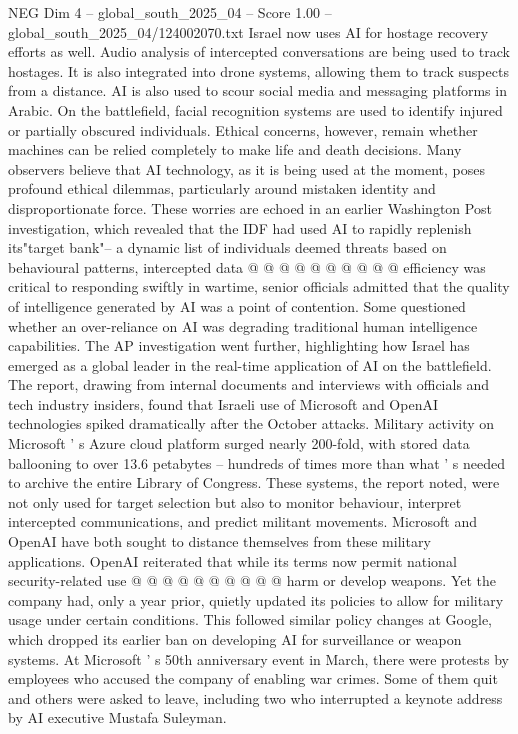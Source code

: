 \begin{textsample}{NEG Dim 4 – global\_south\_2025\_04 – Score 1.00 – global\_south\_2025\_04/124002070.txt}
Israel now uses AI for hostage recovery efforts as well.
Audio analysis of intercepted conversations are being used to track hostages.
It is also integrated into drone systems, allowing them to track suspects from a distance.
AI is also used to scour social media and messaging platforms in Arabic.
On the battlefield, facial recognition systems are used to identify injured or partially obscured individuals.
Ethical concerns, however, remain whether machines can be relied completely to make life and death decisions.
Many observers believe that AI technology, as it is being used at the moment, poses profound ethical dilemmas, particularly around mistaken identity and disproportionate force.
These worries are echoed in an earlier Washington Post investigation, which revealed that the IDF had used AI to rapidly replenish its"target bank"-- a dynamic list of individuals deemed threats based on behavioural patterns, intercepted data @ @ @ @ @ @ @ @ @ @ efficiency was critical to responding swiftly in wartime, senior officials admitted that the quality of intelligence generated by AI was a point of contention.
Some questioned whether an over-reliance on AI was degrading traditional human intelligence capabilities.
The AP investigation went further, highlighting how Israel has emerged as a global leader in the real-time application of AI on the battlefield.
The report, drawing from internal documents and interviews with officials and tech industry insiders, found that Israeli use of Microsoft and OpenAI technologies spiked dramatically after the October attacks.
Military activity on Microsoft ' s Azure cloud platform surged nearly 200-fold, with stored data ballooning to over 13.6 petabytes -- hundreds of times more than what ' s needed to archive the entire Library of Congress.
These systems, the report noted, were not only used for target selection but also to monitor behaviour, interpret intercepted communications, and predict militant movements.
Microsoft and OpenAI have both sought to distance themselves from these military applications.
OpenAI reiterated that while its terms now permit national security-related use @ @ @ @ @ @ @ @ @ @ harm or develop weapons.
Yet the company had, only a year prior, quietly updated its policies to allow for military usage under certain conditions.
This followed similar policy changes at Google, which dropped its earlier ban on developing AI for surveillance or weapon systems.
At Microsoft ' s 50th anniversary event in March, there were protests by employees who accused the company of enabling war crimes.
Some of them quit and others were asked to leave, including two who interrupted a keynote address by AI executive Mustafa Suleyman.

\end{textsample}
